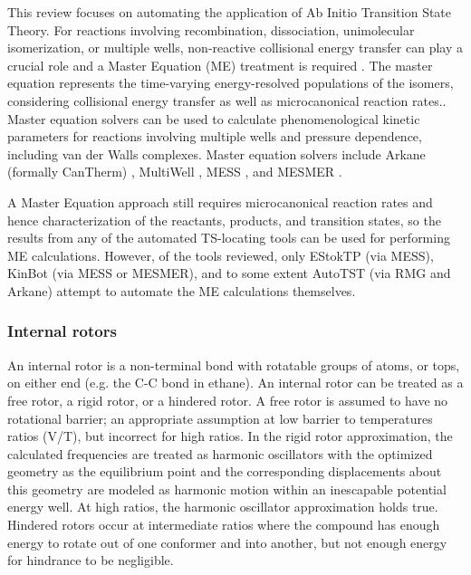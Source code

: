 \documentclass[preprint, 11pt]{elsarticle} %
\begin{document}
This review focuses on automating the application of Ab Initio Transition State Theory.
For reactions involving recombination, dissociation, unimolecular isomerization, or multiple wells,  non-reactive collisional energy transfer can play a crucial role and   a Master Equation (ME) treatment is required \cite{Pilling:2003, truhlar:1996, 10.1126/science.aaa1257,10.1126/science.1260856}. The master equation represents the time-varying energy-resolved populations of the isomers, considering collisional energy transfer as well as microcanonical reaction rates.\cite{Klippenstein:2017eu}.
Master equation solvers can be used to calculate phenomenological kinetic parameters for reactions involving multiple wells and pressure dependence, including van der Walls complexes.
Master equation solvers include Arkane (formally CanTherm) \cite{gao:2016}, MultiWell
\cite{?,?}
,  MESS \cite{MESS:2013}, and MESMER \cite{MESMER:2012}.

A Master Equation approach still requires microcanonical reaction rates and hence characterization of the reactants, products, and transition states, so the results from any of the automated TS-locating tools can be used for performing ME calculations. However, of the tools reviewed, only EStokTP (via MESS), KinBot (via MESS or MESMER), and to some extent AutoTST (via RMG and Arkane) attempt to automate the ME calculations themselves.




\subsubsection{Internal rotors}

An internal rotor is a non-terminal bond with rotatable groups of atoms, or tops, on either end (e.g. the C-C bond in ethane). 
An internal rotor can be treated as a free rotor, a rigid rotor, or a hindered rotor.
A free rotor is assumed to have no rotational barrier; an appropriate assumption at low barrier to temperatures ratios (V/T), but incorrect for high ratios.
In the rigid rotor approximation, the calculated frequencies are treated as harmonic oscillators with the optimized geometry as the equilibrium point and the corresponding displacements about this geometry are modeled as harmonic motion within an inescapable potential energy well.
At high ratios, the harmonic oscillator approximation holds true. 
Hindered rotors occur at intermediate ratios where the compound has enough energy to rotate out of one conformer and into another, but not enough energy for hindrance to be negligible.
\end{document}
